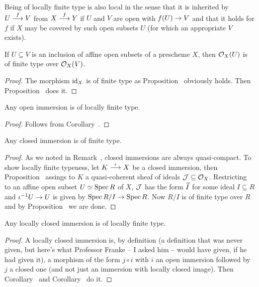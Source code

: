 \documentclass[a4paper,parskip=half,numbers=enddot, DIV=12]{scrreprt}
\begin{document}
\begin{rem*}
    Being of locally finite type is also local in the sense that it is inherited by $U\morphism[f] V$ from $X\morphism[f] Y$ if $U$ and $V$ are open with $f(U)\morphism V$ and that it holds for $f$ if $X$ may be covered by such open subsets $U$ (for which an appropriate $V$ exists).
\end{rem*}
\begin{cor}
    If $U\subseteq V$ is an inclusion of affine open subsets of a prescheme $X$, then $\mathcal{O}_X(U)$ is of finite type over $\mathcal{O}_X(V)$.
\end{cor}
\begin{proof}
	The morphism $\operatorname{id}_X$ is of finite type as Proposition~ obviously holds. Then Proposition~ does it.
\end{proof}
\begin{cor}
    Any open immersion is of locally finite type. 
\end{cor}
\begin{proof}
	Follows from Corollary~.
\end{proof}
\begin{cor}
    Any closed immersion is of finite type.
\end{cor}
\begin{proof}
	As we noted in Remark~, closed immersions are always quasi-compact. To show locally finite typeness, let $K\morphism[\iota]X$ be a closed immersion, then Proposition~ assings to $K$ a quasi-coherent sheaf of ideals $\mathcal{J}\subseteq\mathcal{O}_X$. Restricting to an affine open subset $U\simeq\operatorname{Spec} R$ of $X$, $\mathcal{J}$ has the form $\snake I$ for some ideal $I\subseteq R$ and $\iota^{-1}U\morphism U$ is given by $\Spec R/I\morphism\Spec R$. Now $R/I$ is of finite type over $R$ and by Proposition~ we are done.
\end{proof}
\begin{cor}
    Any locally closed immersion is of locally finite type.
\end{cor}
\begin{proof}
	A locally closed immersion is, by definition (a definition that was never given, but here's what Professor Franke -- I asked him -- would have given, if he had given it), a morphism of the form $j\circ i$ with $i$ an open immersion followed by $j$ a closed one (and not just an immersion with locally closed image). Then Corollary~ and Corollary~ do it. 
\end{proof}
\end{document}
